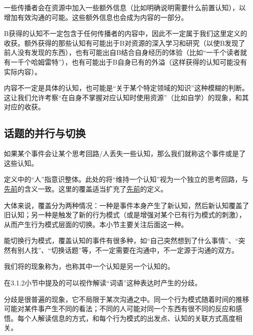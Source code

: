 \begin{explain}
一些传播者会在资源中加入一些额外信息（比如明确说明需要什么前置认知），以增加有效沟通的可能。这些额外信息也会成为内容的一部分。

B获得的认知不一定包含于任何传播者的内容中，因此不一定属于我们这里定义的收获。额外获得的那些认知有可能出于B对资源的深入学习和研究（以使B发现了前人没有发现的东西），也有可能出自B结合自身经历的体验（比如“一千个读者就有一千个哈姆雷特”），也有可能出于B自身已有的外溢（这样获得的认知可能没有实际内容）。

内容不一定是具体的认知，也可能是“关于某个特定领域的知识”这种模糊的判断。这让我们允许考察“在自身不掌握对应认知时使用资源”（比如自学）的现象，和其对应的收获。
\end{explain}

\subsection{话题的并行与切换}
如果某个事件会让某个思考回路/人丢失一些认知，那么我们就称这个事件或是了这些认知。
\begin{explain}
定义中的“人”指意识整体。此处的将“维持一个认知”视为一个独立的思考回路，与\hyperref[def:打断]{先前}的含义一致。这里的覆盖适当扩充了\hyperref[def:覆盖]{先前}的定义。

大体来说，覆盖分为两种情况：一种是事件本身产生了新认知，然后新认知覆盖了旧认知；另一种是触发了新的行为模式（或是增强对某个已有行为模式的刺激），从而产生行为模式层面的切换。本小节主要关注后面这一种。

能切换行为模式，覆盖认知的事件有很多种，如“自己突然想到了什么事情”、“突然有别人找”、“切换话题”等，不一定需要在沟通中，不一定源于沟通的双方。
\end{explain}
我们将的现象称为，也称其中一个认知是另一个认知的。
\begin{explain}
在3.1.2小节中提及的可以视作解读“词语”这种表达时产生的分歧。

分歧是很普遍的现象，它不局限于某次沟通之中。同一个行为模式随着时间的推移可能对某件事产生不同的看法；不同的人可能对同一个东西有很不同的反应和感悟。每个人解读信息的方式，和每个行为模式的出发点、认知的关联方式高度相关。

\end{explain}
